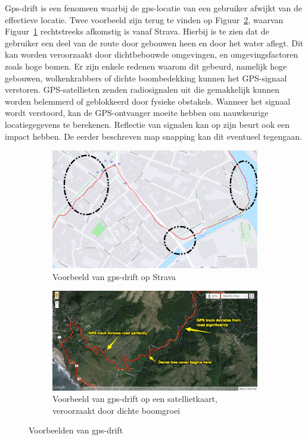 Gps-drift is een fenomeen waarbij de \ac{gps}-locatie van een gebruiker afwijkt
van de effectieve locatie. Twee voorbeeld zijn terug te vinden op
Figuur~\ref{fig:gps_drift}, waarvan Figuur~\ref{fig:gps_drift_Strava}
rechtstreeks afkomstig is vanaf Strava. Hierbij is te zien dat de gebruiker een
deel van de route door gebouwen heen en door het water aflegt. Dit kan worden
veroorzaakt door dichtbebouwde omgevingen, en omgevingsfactoren zoals hoge
bomen. Er zijn enkele redenen waarom dit gebeurd, namelijk hoge gebouwen,
wolkenkrabbers of dichte boombedekking kunnen het GPS-signaal verstoren.
GPS-satellieten zenden radiosignalen uit die gemakkelijk kunnen worden
belemmerd of geblokkeerd door fysieke obstakels. Wanneer het signaal wordt
verstoord, kan de GPS-ontvanger moeite hebben om nauwkeurige locatiegegevens te
berekenen. Reflectie van signalen kan op zijn beurt ook een impact hebben. De
eerder beschreven map snapping kan dit eventueel tegengaan.
\begin{figure}[h]
    \centering
    \begin{subfigure}[b]{.45\textwidth}
        \centering
        \includegraphics[width=\textwidth]{fig/Afwijkingen&Analyses/Crooked Routes/GPS-drift.png}
        \caption{Voorbeeld van gps-drift op Strava}\label{fig:gps_drift_Strava}
    \end{subfigure}\hfill
    \begin{subfigure}[b]{.49\textwidth}
        \centering
        \includegraphics[width=\textwidth]{fig/Afwijkingen&Analyses/Crooked Routes/GPS-Drift_onlnie.jpg}
        \caption{Voorbeeld van gps-drift op een satellietkaart, veroorzaakt door dichte boomgroei~\cite{BadGPSDa19:online}}
    \end{subfigure}
    \caption{Voorbeelden van gps-drift}\label{fig:gps_drift}
\end{figure}

